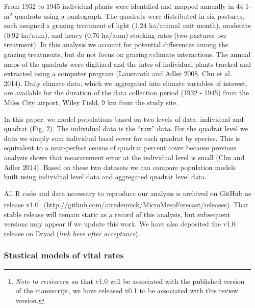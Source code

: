 \documentclass[12pt,]{article}
\begin{document}
From 1932 to 1945 individual plants were identified and mapped annually
in 44 1-$\text{m}^2$ quadrats using a pantograph. The quadrats were
distributed in six pastures, each assigned a grazing treatment of light
(1.24 ha/animal unit month), moderate (0.92 ha/aum), and heavy (0.76
ha/aum) stocking rates (two pastures per treatment). In this analysis we
account for potential differences among the grazing treatments, but do
not focus on grazing$\times$climate interactions. The annual maps of the
quadrats were digitized and the fates of individual plants tracked and
extracted using a computer program (Lauenroth and Adler 2008, Chu et al.
2014). Daily climate data, which we aggregated into climate variables of
interest, are available for the duration of the data collection period
(1932 - 1945) from the Miles City airport, Wiley Field, 9 km from the
study site.

In this paper, we model populations based on two levels of data:
individual and quadrat (Fig. 2). The individual data is the ``raw''
data. For the quadrat level we data we simply sum individual basal cover
for each quadrat by species. This is equivalent to a near-perfect census
of quadrat percent cover because previous analysis shows that
measurement error at the individual level is small (Chu and Adler 2014).
Based on these two datasets we can compare population models built using
individual level data and aggregated quadrat level data.

All R code and data necessary to reproduce our analysis is archived on
GitHub as release v1.0\footnote{\emph{Note to reviewers}: so that v1.0
  will be associated with the published version of the manuscript, we
  have released v0.1 to be associated with this review version.}
(\url{http://github.com/atredennick/MicroMesoForecast/releases}). That
stable release will remain static as a record of this analysis, but
subsequent versions may appear if we update this work. We have also
deposited the v1.0 release on Dryad (\emph{link here after acceptance}).

\subsubsection{Stastical models of vital
rates}\label{stastical-models-of-vital-rates}
\end{document}
